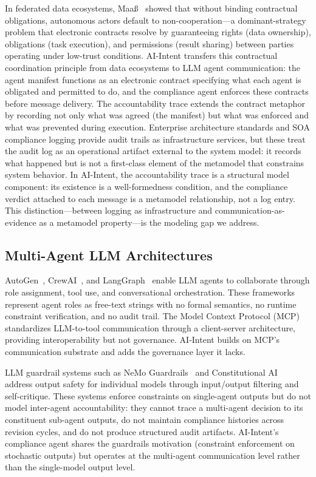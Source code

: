 \documentclass[runningheads]{llncs}
\begin{document}
In federated data ecosystems, Maa\ss{}~\cite{maass2022contract} showed
that without binding contractual obligations, autonomous actors default to
non-cooperation---a dominant-strategy problem that electronic contracts
resolve by guaranteeing rights (data ownership), obligations (task
execution), and permissions (result sharing) between parties operating
under low-trust conditions. AI-Intent transfers this contractual
coordination principle from data ecosystems to LLM agent communication:
the agent manifest functions as an electronic contract specifying what
each agent is obligated and permitted to do, and the compliance agent
enforces these contracts before message delivery. The accountability
trace extends the contract metaphor by recording not only what was agreed
(the manifest) but what was enforced and what was prevented during
execution. Enterprise architecture standards and SOA compliance
logging provide audit trails as infrastructure services, but these treat
the audit log as an operational artifact external to the system model: it
records what happened but is not a first-class element of the metamodel
that constrains system behavior. In AI-Intent, the accountability trace
is a structural model component: its existence is a well-formedness
condition, and the compliance verdict attached to each message is a
metamodel relationship, not a log entry. This distinction---between
logging as infrastructure and communication-as-evidence as a metamodel
property---is the modeling gap we address.

\subsection{Multi-Agent LLM Architectures}

AutoGen~\cite{wu2023autogen}, CrewAI~\cite{crewai2024}, and
LangGraph~\cite{langgraph2024} enable LLM agents to collaborate through
role assignment, tool use, and conversational orchestration. These
frameworks represent agent roles as free-text strings with no formal
semantics, no runtime constraint verification, and no audit trail. The
Model Context Protocol (MCP)~\cite{anthropic2024mcp} standardizes
LLM-to-tool communication through a client-server architecture, providing
interoperability but not governance. AI-Intent builds on MCP's
communication substrate and adds the governance layer it lacks.

LLM guardrail systems such as NeMo
Guardrails~\cite{rebedea2023nemo} and Constitutional
AI~\cite{bai2022constitutional} address output safety for individual
models through input/output filtering and self-critique. These systems
enforce constraints on single-agent outputs but do not model inter-agent
accountability: they cannot trace a multi-agent decision to its
constituent sub-agent outputs, do not maintain compliance histories
across revision cycles, and do not produce structured audit artifacts.
AI-Intent's compliance agent shares the guardrails motivation (constraint
enforcement on stochastic outputs) but operates at the multi-agent
communication level rather than the single-model output level.
\end{document}
